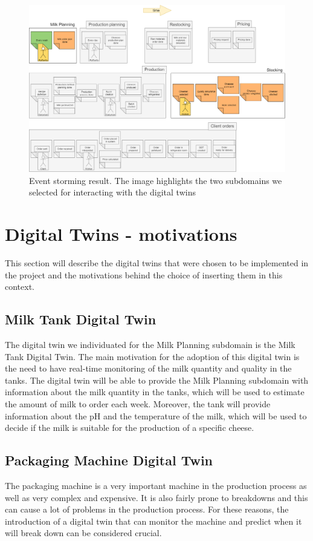 \begin{figure}[H]
    \centering
    \includegraphics[width=\textwidth]{img/event-storming.png}
    \caption{Event storming result. The image highlights the two subdomains we selected for interacting with the digital twins}
    \label{img:event-storming}
\end{figure}


\section{Digital Twins - motivations}
This section will describe the digital twins that were chosen to be implemented in the project and the motivations behind the choice of inserting them in this context.

\subsection{Milk Tank Digital Twin}
The digital twin we individuated for the Milk Planning subdomain is the Milk Tank Digital Twin.
The main motivation for the adoption of this digital twin is the need to have real-time monitoring of the milk quantity and quality in the tanks.
The digital twin will be able to provide the Milk Planning subdomain with information about the milk quantity in the tanks, which will be used to estimate the amount of milk to order each week.
Moreover, the tank will provide information about the pH and the temperature of the milk, which will be used to decide if the milk is suitable for the production of a specific cheese.

\subsection{Packaging Machine Digital Twin}
The packaging machine is a very important machine in the production process as well as very complex and expensive.
It is also fairly prone to breakdowns and this can cause a lot of problems in the production process.
For these reasons, the introduction of a digital twin that can monitor the machine and predict when it will break down can be considered crucial.

